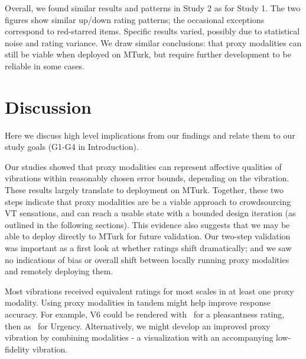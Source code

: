 Overall, we found similar results and patterns in Study 2 as for Study 1. The two figures show similar up/down rating patterns; the occasional exceptions correspond to red-starred items.
Specific results varied, possibly due to statistical noise and rating variance.
We draw similar conclusions: that proxy modalities can still be viable when deployed on MTurk, but require further development to be reliable in some cases.

		
\section{Discussion}
Here we discuss high level implications from our findings and relate them to our study goals (G1-G4 in Introduction).

   Our studies showed that proxy modalities can represent %
   affective qualities of vibrations within reasonably chosen error bounds, depending on the vibration.
   These results largely translate to deployment on MTurk.
   Together, these two steps indicate that proxy modalities are be a viable approach to crowdsourcing VT sensations, and can reach a usable state with a bounded design iteration (as outlined in the following sections).
   This evidence also suggests that we may be able to deploy directly to MTurk for future validation.
   Our two-step validation was important as a first look at whether ratings shift dramatically; and we saw no indications of bias or overall shift between locally running proxy modalities and remotely deploying them.

	Most vibrations received equivalent ratings for most scales in at least one proxy modality.
	Using proxy modalities in tandem might help improve response accuracy.
	For example, V6 could be rendered with \lofi~for a pleasantness rating, then as \linear~for Urgency.
	Alternatively, we might develop an improved proxy vibration by combining modalities - a visualization with an accompanying low-fidelity vibration.
	

